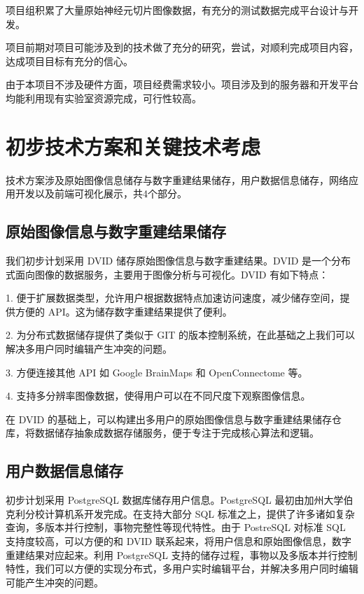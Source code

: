 项目组积累了大量原始神经元切片图像数据，有充分的测试数据完成平台设计与开发。

项目前期对项目可能涉及到的技术做了充分的研究，尝试，对顺利完成项目内容，达成项目目标有充分的信心。

由于本项目不涉及硬件方面，项目经费需求较小。项目涉及到的服务器和开发平台均能利用现有实验室资源完成，可行性较高。

\section{初步技术方案和关键技术考虑}
技术方案涉及原始图像信息储存与数字重建结果储存，用户数据信息储存，网络应用开发以及前端可视化展示，共4个部分。

\subsection{原始图像信息与数字重建结果储存}
我们初步计划采用 DVID 储存原始图像信息与数字重建结果。DVID 是一个分布式面向图像的数据服务，主要用于图像分析与可视化。DVID 有如下特点：

1. 便于扩展数据类型，允许用户根据数据特点加速访问速度，减少储存空间，提供方便的 API。这为储存数字重建结果提供了便利。

2. 为分布式数据储存提供了类似于 GIT 的版本控制系统，在此基础之上我们可以解决多用户同时编辑产生冲突的问题。

3. 方便连接其他 API 如 Google BrainMaps 和 OpenConnectome 等。

4. 支持多分辨率图像数据，使得用户可以在不同尺度下观察图像信息。

在 DVID 的基础上，可以构建出多用户的原始图像信息与数字重建结果储存仓库，将数据储存抽象成数据存储服务，便于专注于完成核心算法和逻辑。

\subsection{用户数据信息储存}
初步计划采用 PostgreSQL 数据库储存用户信息。PostgreSQL 最初由加州大学伯克利分校计算机系开发完成。在支持大部分 SQL 标准之上，提供了许多诸如复杂查询，多版本并行控制，事物完整性等现代特性。由于 PostreSQL 对标准 SQL 支持度较高，可以方便的和 DVID 联系起来，将用户信息和原始图像信息，数字重建结果对应起来。利用 PostgreSQL 支持的储存过程，事物以及多版本并行控制特性，我们可以方便的实现分布式，多用户实时编辑平台，并解决多用户同时编辑可能产生冲突的问题。

